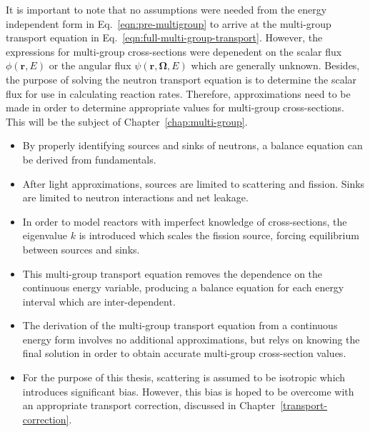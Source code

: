 It is important to note that no assumptions were needed from the energy independent form in Eq.~\ref{eqn:pre-multigroup} to arrive at the multi-group transport equation in Eq.~\ref{eqn:full-multi-group-transport}. However, the expressions for multi-group cross-sections were depenedent on the scalar flux $\phi(\mathbf{r}, E)$ or the angular flux $\psi(\mathbf{r},\mathbf{\Omega},E)$ which are generally unknown. Besides, the purpose of solving the neutron transport equation is to determine the scalar flux for use in calculating reaction rates. Therefore, approximations need to be made in order to determine appropriate values for multi-group cross-sections. This will be the subject of Chapter~\ref{chap:multi-group}.

\newpage
\vfill
\begin{highlightsbox}[frametitle=Highlights]
	\begin{itemize}
		\item By properly identifying sources and sinks of neutrons, a balance equation can be derived from fundamentals.
		\item After light approximations, sources are limited to scattering and fission. Sinks are limited to neutron interactions and net leakage.
		\item In order to model reactors with imperfect knowledge of cross-sections, the eigenvalue $k$ is introduced which scales the fission source, forcing equilibrium between sources and sinks.
		\item This multi-group transport equation removes the dependence on the continuous energy variable, producing a balance equation for each energy interval which are inter-dependent.
		\item The derivation of the multi-group transport equation from a continuous energy form involves no additional approximations, but relys on knowing the final solution in order to obtain accurate multi-group cross-section values.
		\item For the purpose of this thesis, scattering is assumed to be isotropic which introduces significant bias. However, this bias is hoped to be overcome with an appropriate transport correction, discussed in Chapter~\ref{transport-correction}.
	\end{itemize}
\end{highlightsbox}
\vfill